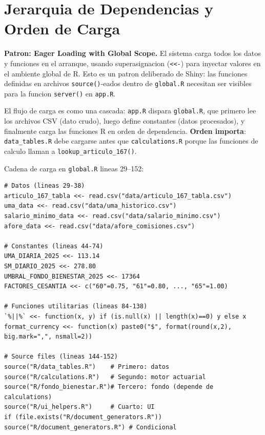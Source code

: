 \documentclass[11pt, letterpaper, twoside]{report}
\begin{document}
\section{Jerarquia de Dependencias y Orden de Carga}
\label{sec:dependencias}

\begin{patronbox}
\textbf{Patron: Eager Loading with Global Scope.} El sistema carga todos los datos
y funciones en el arranque, usando superasignacion (\texttt{<<-}) para inyectar
valores en el ambiente global de R. Esto es un patron deliberado de Shiny: las
funciones definidas en archivos \texttt{source()}-eados dentro de \texttt{global.R}
necesitan ser visibles para la funcion \texttt{server()} en \texttt{app.R}.
\end{patronbox}

\begin{intuicionbox}
El flujo de carga es como una cascada: \texttt{app.R} dispara \texttt{global.R},
que primero lee los archivos CSV (dato crudo), luego define constantes (datos
procesados), y finalmente carga las funciones R en orden de dependencia.
\textbf{Orden importa}: \texttt{data\_tables.R} debe cargarse antes que
\texttt{calculations.R} porque las funciones de calculo llaman a
\texttt{lookup\_articulo\_167()}.
\end{intuicionbox}

\begin{codigobox}
Cadena de carga en \texttt{global.R} lineas 29--152:
\begin{lstlisting}[caption={Orden de carga en global.R}]
# Datos (lineas 29-38)
articulo_167_tabla <<- read.csv("data/articulo_167_tabla.csv")
uma_data <<- read.csv("data/uma_historico.csv")
salario_minimo_data <<- read.csv("data/salario_minimo.csv")
afore_data <<- read.csv("data/afore_comisiones.csv")

# Constantes (lineas 44-74)
UMA_DIARIA_2025 <<- 113.14
SM_DIARIO_2025 <<- 278.80
UMBRAL_FONDO_BIENESTAR_2025 <<- 17364
FACTORES_CESANTIA <<- c("60"=0.75, "61"=0.80, ..., "65"=1.00)

# Funciones utilitarias (lineas 84-138)
`%||%` <<- function(x, y) if (is.null(x) || length(x)==0) y else x
format_currency <<- function(x) paste0("$", format(round(x,2), big.mark=",", nsmall=2))

# Source files (lineas 144-152)
source("R/data_tables.R")    # Primero: datos
source("R/calculations.R")   # Segundo: motor actuarial
source("R/fondo_bienestar.R")# Tercero: fondo (depende de calculations)
source("R/ui_helpers.R")     # Cuarto: UI
if (file.exists("R/document_generators.R")) source("R/document_generators.R") # Condicional
\end{lstlisting}
\end{codigobox}
\end{document}
